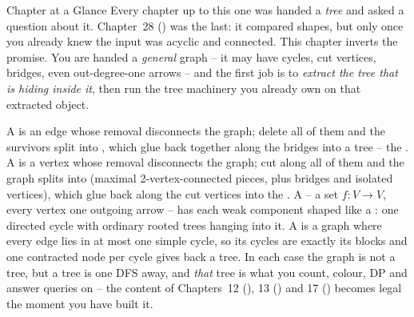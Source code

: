 \begin{chaptertheorybox}{Chapter at a Glance}
Every chapter up to this one was handed a \emph{tree} and asked a question about
it.  Chapter~28 () was the last: it compared shapes, but only once you
already knew the input was acyclic and connected.  This chapter inverts the
promise.  You are handed a \emph{general} graph -- it may have cycles, cut
vertices, bridges, even out-degree-one arrows -- and the first job is to
\emph{extract the tree that is hiding inside it}, then run the tree machinery you
already own on that extracted object.

A  is an edge whose removal disconnects the graph; delete all of
them and the survivors split into , which glue
back together along the bridges into a tree -- the .  A
 is a vertex whose removal disconnects the graph; cut
along all of them and the graph splits into  (maximal
2-vertex-connected pieces, plus bridges and isolated vertices), which glue back
along the cut vertices into the .  A 
-- a set \(f\colon V\to V\), every vertex one outgoing arrow -- has each weak
component shaped like a : one directed cycle with ordinary rooted trees
hanging into it.  A  is a graph where every edge lies in at most one
simple cycle, so its cycles are exactly its blocks and one contracted node per
cycle gives back a tree.  In each case the graph is not a tree, but a tree is
one DFS away, and \emph{that} tree is what you count, colour, DP and answer
queries on -- the content of Chapters~12 (), 13 () and 17
() becomes legal the moment you have built it.


\end{chaptertheorybox}
